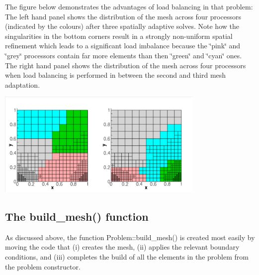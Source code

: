 The figure below demonstrates the advantages of load balancing in that problem\+: The left hand panel shows the distribution of the mesh across four processors (indicated by the colours) after three spatially adaptive solves. Note how the singularities in the bottom corners result in a strongly non-\/uniform spatial refinement which leads to a significant load imbalance because the \char`\"{}pink\char`\"{} and \char`\"{}grey\char`\"{} processors contain far more elements than then \char`\"{}green\char`\"{} and \char`\"{}cyan\char`\"{} ones. The right hand panel shows the distribution of the mesh across four processors when load balancing is performed in between the second and third mesh adaptation.

 
\begin{DoxyImage}
\includegraphics[width=0.75\textwidth]{load_balance_partition}
\end{DoxyImage}
\hypertarget{index_build_mesh}{}\subsection{The build\+\_\+mesh() function}\label{index_build_mesh}
As discussed above, the function {\ttfamily Problem\+::build\+\_\+mesh()} is created most easily by moving the code that (i) creates the mesh, (ii) applies the relevant boundary conditions, and (iii) completes the build of all the elements in the problem from the problem constructor.

